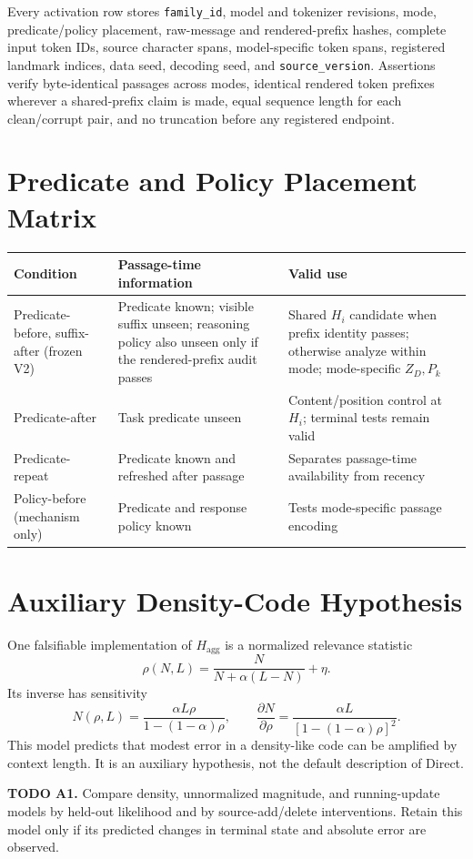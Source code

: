 \documentclass[10pt,twocolumn]{article}
\newcommand{\todoid}[2]{%
  \par\noindent\textcolor{red!75!black}{\textbf{TODO #1.} #2}\par}
\begin{document}
Every activation row stores
\texttt{family\_id}, model and tokenizer revisions, mode, predicate/policy placement,
raw-message and rendered-prefix hashes, complete input token IDs, source character spans,
model-specific token spans, registered landmark indices, data seed, decoding seed, and
\texttt{source\_version}. Assertions verify byte-identical passages across modes, identical
rendered token prefixes wherever a shared-prefix claim is made, equal sequence length for each
clean/corrupt pair, and no truncation before any registered endpoint.

\section{Predicate and Policy Placement Matrix}
\begin{center}
\small
\captionsetup{hypcap=false}
\begin{tabularx}{\columnwidth}{
  >{\raggedright\arraybackslash}p{}
  >{\raggedright\arraybackslash}p{}
  Y}
\toprule
Condition & Passage-time information & Valid use \\
\midrule
Predicate-before, suffix-after (frozen V2) &
Predicate known; visible suffix unseen; reasoning policy also unseen only if the rendered-prefix
audit passes &
Shared $H_i$ candidate when prefix identity passes; otherwise analyze within mode; mode-specific
$Z_D,P_k$ \\
Predicate-after &
Task predicate unseen &
Content/position control at $H_i$; terminal tests remain valid \\
Predicate-repeat &
Predicate known and refreshed after passage &
Separates passage-time availability from recency \\
Policy-before (mechanism only) &
Predicate and response policy known &
Tests mode-specific passage encoding \\
\bottomrule
\end{tabularx}
\end{center}

\section{Auxiliary Density-Code Hypothesis}
One falsifiable implementation of $H_{\mathrm{agg}}$ is a normalized relevance statistic
\[
 \rho(N,L)=\frac{N}{N+\alpha(L-N)}+\eta.
\]
Its inverse has sensitivity
\[
 N(\rho,L)=\frac{\alpha L\rho}{1-(1-\alpha)\rho},
 \qquad
 \frac{\partial N}{\partial\rho}
 =\frac{\alpha L}{[1-(1-\alpha)\rho]^2}.
\]
This model predicts that modest error in a density-like code can be amplified by context length.
It is an auxiliary hypothesis, not the default description of Direct.
\todoid{A1}{Compare density, unnormalized magnitude, and running-update models by held-out
likelihood and by source-add/delete interventions. Retain this model only if its predicted
changes in terminal state and absolute error are observed.}
\end{document}
